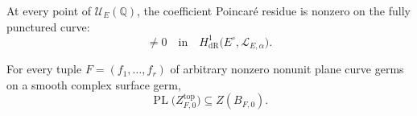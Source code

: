 \documentclass[10pt,a4paper]{amsart}
\DeclareMathOperator{\PL}{PL}
\newcommand{\Lcal}{\mathscr L}
\newcommand{\Q}{\mathbb Q}
\begin{document}
\begin{corollary}\label{cor:selected-blanco-class}
At every point of $\mathcal U_E(\Q)$, the coefficient Poincar\'e residue is nonzero on the fully punctured curve:
\begin{equation*}
[R_{E,\alpha}]
 \neq0
 \quad\text{in}\quad
 H^1_{\mathrm{dR}}
 \bigl(E^\circ,\Lcal_{E,\alpha}\bigr).
\end{equation*}
\end{corollary}

\begin{theorem}\label{thm:main-thm-top}
For every tuple $F=(f_1,\ldots,f_r)$ of arbitrary nonzero nonunit plane curve germs on a smooth complex surface germ,
\begin{equation*}
\PL\bigl(Z^{\mathrm{top}}_{F,0}\bigr) \subseteq Z(B_{F,0}).
\end{equation*}
\end{theorem}
\end{document}
